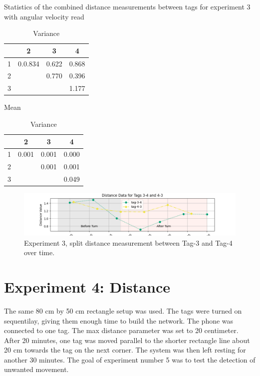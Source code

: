 \begin{table}[ht]
\centering
\caption{Statistics of the combined distance measurements between tags for experiment 3 with angular velocity read}
\begin{minipage}{0.45\textwidth}
\centering
\begin{tabular}{|c|c c c|}
\hline
  & 2 & 3 & 4 \\
\hline
1    & 0.0.834 & 0.622 & 0.868 \\
2   &  & 0.770 & 0.396 \\
3   &  &  & 1.177 \\
\hline
\end{tabular}
\caption*{Mean}
\end{minipage}
\hfill
\begin{minipage}{0.45\textwidth}
\centering
\begin{tabular}{|c|c c c|}
\hline
  & 2 & 3 & 4 \\
\hline
1    & 0.001 & 0.001 & 0.000 \\
2   &  & 0.001 & 0.001 \\
3   &  &  & 0.049 \\
\hline
\end{tabular}
\caption*{Variance}
\end{minipage}
\label{tab:exp4_var_distanc}
\end{table}

\begin{figure}[ht!]
	\includegraphics[width=\linewidth]{graphics/exp/exp4_2_gyro_split_distance_3_4.png}
	\caption{Experiment 3, split distance measurement between Tag-3 and Tag-4 over time.}
	\label{f:exp4_graphs_dist_split_3_4}
\end{figure}

\section{Experiment 4: Distance}
\label{ss:exp_4}
The same 80 cm by 50 cm rectangle setup was used.
The tags were turned on sequentilay, giving them enough time to build the network.
The phone was connected to one tag.
The max distance parameter was set to 20 centimeter.
After 20 minutes, one tag was moved parallel to the shorter rectangle line about 20 cm towards the tag on the next corner.
The system was then left resting for another 30 minutes.
The goal of experiment number 5 was to test the detection of unwanted movement.

